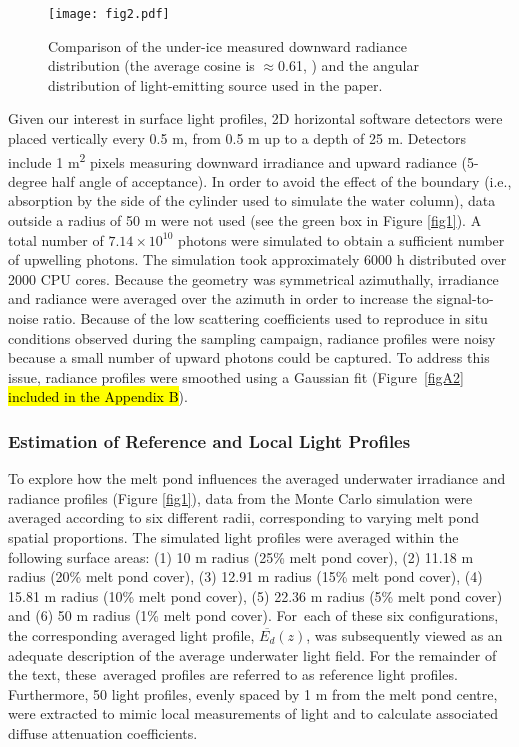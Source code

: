 \documentclass[applsci,article,accept,moreauthors,pdftex,10pt,a4paper]{Definitions/mdpi}
\newcommand{\meanedz}{\ensuremath{{\overline{E_d}(z)}}}
\begin{document}
\begin{figure}[H]
	\centering
	\texttt{[image: fig2.pdf]}
	\caption{Comparison of the under-ice measured downward radiance distribution (the average cosine is $\approx$0.61, \cite{Girard2018}) and the angular distribution of light-emitting source used in the paper.}
	\label{fig2}
\end{figure}




Given our interest in surface light profiles, 2D horizontal software detectors were placed vertically every 0.5 m, from 0.5 m up to a depth of 25 m. Detectors include 1 m\textsuperscript{2} pixels measuring downward irradiance and upward radiance (5-degree half angle of acceptance). In order to avoid the effect of the boundary (i.e., absorption by the side of the cylinder used to simulate the water column), data outside a radius of 50 m were not used (see the green box in Figure \ref{fig1}). A total number of $7.14 \times 10^{10}$ photons were simulated to obtain a sufficient number of upwelling photons. The simulation took approximately 6000 h distributed over 2000 CPU cores. Because the geometry was symmetrical azimuthally, irradiance and radiance were averaged over the azimuth in order to increase the signal-to-noise ratio. Because of the low scattering coefficients used to reproduce in situ conditions observed during the sampling campaign, radiance profiles were noisy because a small number of upward photons could be captured. To address this issue, radiance profiles were smoothed using a Gaussian fit (Figure~\ref{figA2} \hl{included in the Appendix B}). 

\subsubsection{Estimation of Reference and Local Light Profiles}

To explore how the melt pond influences the averaged underwater irradiance and radiance profiles (Figure \ref{fig1}), data from the Monte Carlo simulation were averaged according to six different radii, corresponding to varying melt pond spatial proportions. The simulated light profiles were averaged within the following surface areas: (1) 10 m radius (25\% melt pond cover), (2) 11.18 m radius (20\% melt pond cover), (3) 12.91 m radius (15\% melt pond cover), (4) 15.81 m radius (10\% melt pond cover), (5) 22.36 m radius (5\% melt pond cover) and (6) 50 m radius (1\% melt pond cover). For~each of these six configurations, the corresponding averaged light profile, \meanedz{}, was subsequently viewed as an adequate description of the average underwater light field. For the remainder of the text, these~averaged profiles are referred to as reference light profiles. Furthermore, 50 light profiles, evenly spaced by 1 m from the melt pond centre, were extracted to mimic local measurements of light and to calculate associated diffuse attenuation coefficients.
\end{document}
